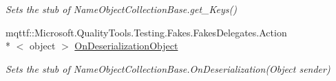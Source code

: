 \begin{DoxyCompactItemize}
\begin{DoxyCompactList}\small\item\em Sets the stub of Name\-Object\-Collection\-Base.\-get\-\_\-\-Keys()\end{DoxyCompactList}\item 
mqttf\-::\-Microsoft.\-Quality\-Tools.\-Testing.\-Fakes.\-Fakes\-Delegates.\-Action\\*
$<$ object $>$ \hyperlink{class_system_1_1_collections_1_1_specialized_1_1_fakes_1_1_stub_name_object_collection_base_a0c22c926bee254a1e03c40de8ccce0de}{On\-Deserialization\-Object}
\begin{DoxyCompactList}\small\item\em Sets the stub of Name\-Object\-Collection\-Base.\-On\-Deserialization(\-Object sender)\end{DoxyCompactList}\end{DoxyCompactItemize}
